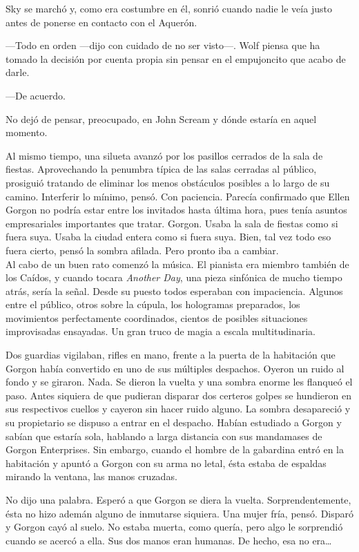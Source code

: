 Sky se marchó y, como era costumbre en él, sonrió cuando nadie le veía justo antes de ponerse en contacto con el Aquerón.

---Todo en orden ---dijo con cuidado de no ser visto---. Wolf piensa que ha tomado la decisión por cuenta propia sin pensar en el empujoncito que acabo de darle.

---De acuerdo.

No dejó de pensar, preocupado, en John Scream y dónde estaría en aquel momento.

Al mismo tiempo, una silueta avanzó por los pasillos cerrados de la sala de fiestas. Aprovechando la penumbra típica de las salas cerradas al público, prosiguió tratando de eliminar los menos obstáculos posibles a lo largo de su camino. Interferir lo mínimo, pensó. Con paciencia. Parecía confirmado que Ellen Gorgon no podría estar entre los invitados hasta última hora, pues tenía asuntos empresariales importantes que tratar. Gorgon. Usaba la sala de fiestas como si fuera suya. Usaba la ciudad entera como si fuera suya. Bien, tal vez todo eso fuera cierto, pensó la sombra afilada. Pero pronto iba a cambiar.\\

\noindent{}Al cabo de un buen rato comenzó la música. El pianista era miembro también de los Caídos, y cuando tocara \emph{Another Day}, una pieza sinfónica de mucho tiempo atrás, sería la señal. Desde su puesto todos esperaban con impaciencia. Algunos entre el público, otros sobre la cúpula, los hologramas preparados, los movimientos perfectamente coordinados, cientos de posibles situaciones improvisadas ensayadas. Un gran truco de magia a escala multitudinaria.

Dos guardias vigilaban, rifles en mano, frente a la puerta de la habitación que Gorgon había convertido en uno de sus múltiples despachos. Oyeron un ruido al fondo y se giraron. Nada. Se dieron la vuelta y una sombra enorme les flanqueó el paso. Antes siquiera de que pudieran disparar dos certeros golpes se hundieron en sus respectivos cuellos y cayeron sin hacer ruido alguno. La sombra desapareció y su propietario se dispuso a entrar en el despacho. Habían estudiado a Gorgon y sabían que estaría sola, hablando a larga distancia con sus mandamases de Gorgon Enterprises. Sin embargo, cuando el hombre de la gabardina entró en la habitación y apuntó a Gorgon con su arma no letal, ésta estaba de espaldas mirando la ventana, las manos cruzadas.

No dijo una palabra. Esperó a que Gorgon se diera la vuelta. Sorprendentemente, ésta no hizo ademán alguno de inmutarse siquiera. Una mujer fría, pensó. Disparó y Gorgon cayó al suelo. No estaba muerta, como quería, pero algo le sorprendió cuando se acercó a ella. Sus dos manos eran humanas. De hecho, esa no era\dots{}

